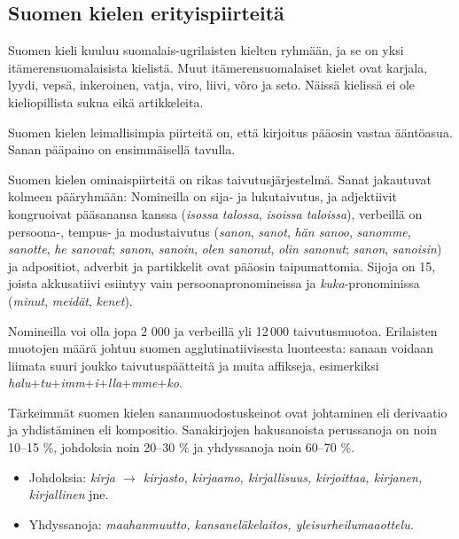 \begin{multicols}{2}
\subsection{Suomen kielen erityispiirteitä}

Suomen kieli kuuluu suomalais-ugrilaisten kielten ryhmään, ja se on yksi itämerensuomalaisista kielistä. Muut itämerensuomalaiset kielet ovat karjala, lyydi, vepsä, inkeroinen, vatja, viro, liivi, võro ja seto. Näissä kielissä ei ole kieliopillista sukua eikä artikkeleita.

Suomen kielen leimallisimpia piirteitä on, että kirjoitus pääosin vastaa ääntöasua. Sanan pääpaino on ensimmäisellä tavulla.

Suomen kielen ominaispiirteitä on rikas taivutusjärjestelmä. Sanat jakautuvat kolmeen pääryhmään: Nomineilla on sija- ja lukutaivutus, ja adjektiivit kongruoivat pääsanansa kanssa (\textit{isossa talossa}, \textit{isoissa taloissa}), verbeillä on persoona-, tempus- ja modustaivutus (\textit{sanon}, \textit{sanot}, \textit{hän sanoo}, \textit{sanomme}, \textit{sanotte}, \textit{he sanovat}; \textit{sanon}, \textit{sanoin}, \textit{olen sanonut}, \textit{olin sanonut}; \textit{sanon}, \textit{sanoisin}) ja adpositiot, adverbit ja partikkelit ovat pääosin taipumattomia. Sijoja on 15, joista akkusatiivi esiintyy vain persoonapronomineissa ja \textit{kuka}-pronominissa (\textit{minut}, \textit{meidät}, \textit{kenet}).  

Nomineilla voi olla jopa 2 000 ja verbeillä yli 12\,000 taivutusmuotoa.  Erilaisten muotojen määrä johtuu suomen agglutinatiivisesta luonteesta: sanaan voidaan liimata suuri joukko taivutuspäätteitä ja muita affikseja, esimerkiksi \textit{halu}+\textit{tu}+\textit{imm}+\textit{i}+\textit{lla}+\textit{mme}+\textit{ko}.

Tärkeimmät suomen kielen sananmuodostuskeinot ovat johtaminen eli derivaatio ja
yhdistäminen eli kompositio. Sanakirjojen hakusanoista perussanoja on noin
10–15 \%, johdoksia noin 20–30 \% ja yhdyssanoja noin 60–70 \%.

\begin{itemize}
\item Johdoksia: \textit{kirja $\to$ kirjasto, kirjaamo, kirjallisuus, kirjoittaa, kirjanen,
    kirjallinen} jne.

\item Yhdyssanoja: \textit{maahanmuutto, kansaneläkelaitos, yleisurheilumaaottelu.}
\end{itemize}


\end{multicols}
